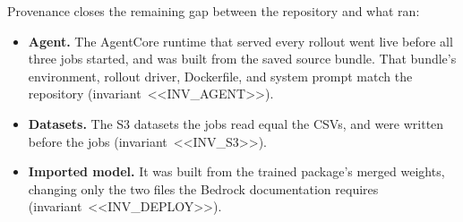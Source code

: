 \documentclass[11pt]{article}
\begin{document}
Provenance closes the remaining gap between the repository and what ran:
\begin{itemize}[leftmargin=*]
\item \textbf{Agent.} The AgentCore runtime that served every rollout went live before all three jobs
started, and was built from the saved source bundle. That bundle's environment, rollout driver, Dockerfile,
and system prompt match the repository (invariant~<<INV_AGENT>>).
\item \textbf{Datasets.} The S3 datasets the jobs read equal the CSVs, and were written before the jobs
(invariant~<<INV_S3>>).
\item \textbf{Imported model.} It was built from the trained package's merged weights, changing only the
two files the Bedrock documentation requires (invariant~<<INV_DEPLOY>>).
\end{itemize}

\appendix
\end{document}
